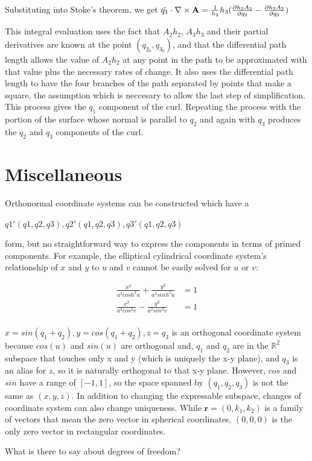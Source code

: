 \documentclass{article}
\begin{document}
Substituting into Stoke's theorem, we get $\hat{q_1} \cdot \nabla \times \textbf{A} = \frac{1}{h_2}{h_3} (\frac{\partial{h_3 A_3}}{\partial{q_2}} - \frac{\partial{h_2 A_2}}{\partial{q_3}}) $

This integral evaluation uses the fact that $A_2 h_2$, $A_3 h_3$ and their partial derivatives are known at the point $(q_{2_0}, q_{3_0})$, and that the differential path length allows the value of $A_2 h_2$ at any point in the path to be approximated with that value plus the necessary rates of change. It also uses the differential path length to have the four branches of the path separated by points that make a square, the assumption which is neccesary to allow the last step of simplification. This process gives the $q_1$ component of the curl. Repeating the process with the portion of the surface whose normal is parallel to $q_2$ and again with $q_3$ produces the $q_2$ and $q_3$ components of the curl.

\section*{Miscellaneous}

Orthonormal coordinate systems can be constructed which have a 

$q1'(q1,q2,q3), q2'(q1,q2,q3), q3'(q1,q2,q3) $ 

form, but no straightforward way to express the components in terms of primed components. For example, the elliptical cylindrical coordinate system's relationship of $x$ and $y$ to $u$ and $v$ cannot be easily solved for $u$ or $v$:

\begin{align*}
\frac{x^2}{a^2 cosh^2 u} + \frac{y^2}{a^2 sinh^2 u} &= 1 \\
\frac{x^2}{a^2 cos^2 v} - \frac{y^2}{a^2 sin^2 v} &= 1 \\
\end{align*}

$x = sin(q_1 + q_2), y = cos(q_1 + q_2), z = q_3$ is an orthogonal coordinate system because $cos(u)$ and $sin(u)$ are orthogonal and, $q_1$ and $q_2$ are in the $\mathbb{R}^2$ subspace that touches only x and y (which is uniquely the x-y plane), and $q_3$ is an alias for $z$, so it is naturally orthogonal to that x-y plane. However, $cos$ and $sin$ have a range of $[-1,1]$, so the space spanned by $(q_1,q_2,q_3)$ is not the same as $(x,y,z)$. In addition to changing the expressable subspace, changes of coordinate system can also change uniqueness. While $\textbf{r} = (0, k_1, k_2)$ is a family of vectors that mean the zero vector in spherical coordinates, $(0,0,0)$ is the only zero vector in rectangular coordinates.

What is there to say about degrees of freedom?

\printbibliography
\end{document}

